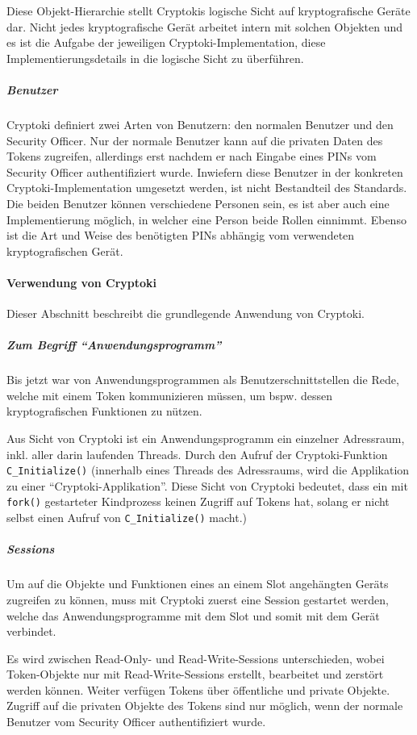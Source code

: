 \documentclass[10pt,a4paper]{article}
\begin{document}
Diese Objekt-Hierarchie stellt Cryptokis logische Sicht auf kryptografische Geräte dar.
Nicht jedes kryptografische Gerät arbeitet intern mit solchen Objekten und es ist die
Aufgabe der jeweiligen Cryptoki-Implementation, diese Implementierungsdetails in die
logische Sicht zu überführen.

\subparagraph{Benutzer}
Cryptoki definiert zwei Arten von Benutzern: den normalen Benutzer und den Security
Officer. Nur der normale Benutzer kann auf die privaten Daten des Tokens zugreifen,
allerdings erst nachdem er nach Eingabe eines PINs vom Security Officer authentifiziert
wurde. Inwiefern diese Benutzer in der konkreten Cryptoki-Implementation umgesetzt werden,
ist nicht Bestandteil des Standards. Die beiden Benutzer können verschiedene Personen
sein, es ist aber auch eine Implementierung möglich, in welcher eine Person beide Rollen
einnimmt. Ebenso ist die Art und Weise des benötigten PINs abhängig vom verwendeten
kryptografischen Gerät.

\paragraph{Verwendung von Cryptoki}
Dieser Abschnitt beschreibt die grundlegende Anwendung von Cryptoki.

\subparagraph{Zum Begriff "`Anwendungsprogramm"'}
Bis jetzt war von Anwendungsprogrammen als Benutzerschnittstellen die Rede, welche mit
einem Token kommunizieren müssen, um bspw. dessen kryptografischen Funktionen zu nützen.

Aus Sicht von Cryptoki ist ein Anwendungsprogramm ein einzelner Adressraum, inkl. aller
darin laufenden Threads. Durch den Aufruf der Cryptoki-Funktion \texttt{C\_Initialize()}
(innerhalb eines Threads des Adressraums, wird die Applikation zu einer
"`Cryptoki-Applikation"'. Diese Sicht von Cryptoki bedeutet, dass ein mit \texttt{fork()}
gestarteter Kindprozess keinen Zugriff auf Tokens hat, solang er nicht selbst einen Aufruf
von \texttt{C\_Initialize()} macht.)

\subparagraph{Sessions}
Um auf die Objekte und Funktionen eines an einem Slot angehängten Geräts zugreifen zu
können, muss mit Cryptoki zuerst eine Session gestartet werden, welche das
Anwendungsprogramme mit dem Slot und somit mit dem Gerät verbindet.

Es wird zwischen Read-Only- und Read-Write-Sessions unterschieden, wobei Token-Objekte nur
mit Read-Write-Sessions erstellt, bearbeitet und zerstört werden können. Weiter verfügen
Tokens über öffentliche und private Objekte. Zugriff auf die privaten Objekte des Tokens
sind nur möglich, wenn der normale Benutzer vom Security Officer authentifiziert wurde.
\end{document}
